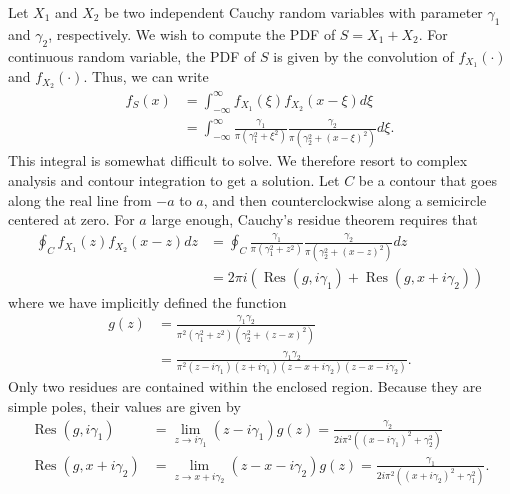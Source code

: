 Let $X_1$ and $X_2$ be two independent Cauchy random variables with parameter $\gamma_1$ and $\gamma_2$, respectively.
We wish to compute the PDF of $S = X_1 + X_2$.
For continuous random variable, the PDF of $S$ is given by the convolution of $f_{X_1} (\cdot)$ and $f_{X_2} (\cdot)$.
Thus, we can write
\begin{equation*}
\begin{split}
f_S (x) &= \int_{-\infty}^{\infty} f_{X_1} (\xi) f_{X_2} (x - \xi) d\xi \\
 &= \int_{-\infty}^{\infty}
\frac{\gamma_1}{\pi \left( \gamma_1^2 + \xi^2 \right)}
\frac{\gamma_2}{\pi \left( \gamma_2^2 + (x - \xi)^2 \right)} d\xi .
\end{split}
\end{equation*}
This integral is somewhat difficult to solve.
We therefore resort to complex analysis and contour integration to get a solution.
Let $C$ be a contour that goes along the real line from $-a$ to $a$, and then counterclockwise along a semicircle centered at zero.
For $a$ large enough, Cauchy's residue theorem requires that
\begin{equation} \label{equation:CauchyConvolutionContour}
\begin{split}
\oint_{C} f_{X_1} (z) f_{X_2} (x - z) dz
&= \oint_{C} 
\frac{\gamma_1}{\pi \left( \gamma_1^2 + z^2 \right)}
\frac{\gamma_2}{\pi \left( \gamma_2^2 + (x - z)^2 \right)} dz \\
&= 2 \pi i \left( \operatorname{Res} (g, i \gamma_1)
+ \operatorname{Res} (g, x + i \gamma_2) \right)
\end{split}
\end{equation}
where we have implicitly defined the function
\begin{equation*}
\begin{split}
g(z) &= \frac{\gamma_1 \gamma_2}{\pi^2 \left( \gamma_1^2 + z^2 \right)
\left( \gamma_2^2 + (z - x)^2 \right) } \\
&= \frac{\gamma_1 \gamma_2}{\pi^2
( z - i \gamma_1 ) ( z + i \gamma_1 )
( z - x + i \gamma_2 ) ( z - x - i \gamma_2 ) } .
\end{split}
\end{equation*}
Only two residues are contained within the enclosed region.
Because they are simple poles, their values are given by
\begin{align*}
\operatorname{Res} (g, i \gamma_1)
&= \lim_{z \rightarrow i \gamma_1} (z - i \gamma_1) g(z)
= \frac{\gamma_2}{2 i \pi^2
\left( ( x - i \gamma_1 )^2 + \gamma_2^2 \right) } \\
\operatorname{Res} (g, x + i \gamma_2)
&= \lim_{z \rightarrow x + i \gamma_2} (z - x - i \gamma_2) g(z)
= \frac{\gamma_1}{2 i \pi^2
\left( ( x + i \gamma_2 )^2 + \gamma_1^2 \right) } .
\end{align*}
